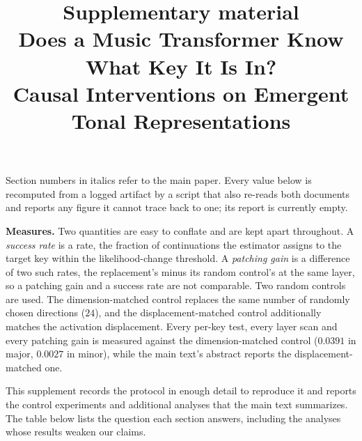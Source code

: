 \documentclass{article}
\title{Supplementary material\\
Does a Music Transformer Know What Key It Is In?\\
Causal Interventions on Emergent Tonal Representations}
\begin{document}
\maketitle
\vspace{-2.5em}

Section numbers in italics refer to the main paper. Every value below is recomputed
from a logged artifact by a script that also re-reads both documents and reports any
figure it cannot trace back to one; its report is currently empty.

%
\textbf{Measures.} Two quantities are easy to conflate and are kept apart throughout.
A \emph{success rate} is a rate, the fraction of continuations the estimator assigns to
the target key within the likelihood-change threshold. A \emph{patching gain} is a
difference of two such rates, the replacement's minus its random control's at the same
layer, so a patching gain and a success rate are not comparable. Two random controls are
used. The dimension-matched control replaces the same number of randomly chosen
directions ($24$), and the displacement-matched control additionally matches the
activation displacement. Every per-key test, every layer scan and every patching gain is
measured against the dimension-matched control ($0.0391$ in major, $0.0027$ in minor),
while the main text's abstract reports the displacement-matched one.

This supplement records the protocol in enough detail to reproduce it and reports the
control experiments and additional analyses that the main text summarizes. The table
below lists the question each section answers, including the analyses whose results
weaken our claims.
\end{document}
